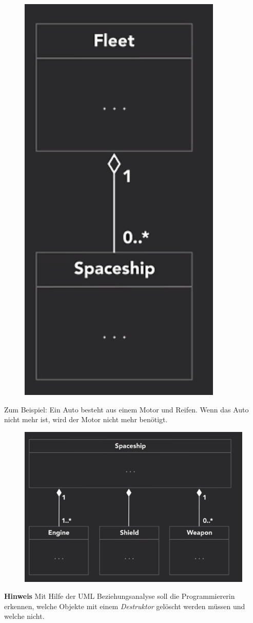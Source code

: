 \begin{figure}[H]
	\centering
	\includegraphics[scale = 0.2]{attachment/chapter_2/Scc015}
	\caption{}
	\label{fig:Scc015}
\end{figure}
Zum Beispiel: Ein Auto besteht aus einem Motor und Reifen. Wenn das Auto nicht mehr ist, wird der Motor nicht mehr benötigt.
\begin{figure}[H]
	\centering
	\includegraphics[scale = 0.2]{attachment/chapter_2/Scc016}
	\caption{}
	\label{fig:Scc016}
\end{figure}
\textbf{Hinweis} Mit Hilfe der UML Beziehungsanalyse soll die Programmiererin erkennen, welche Objekte mit einem \textit{Destruktor} gelöscht werden müssen und welche nicht. 
